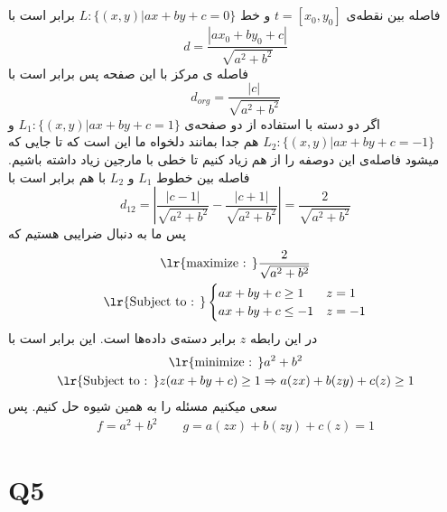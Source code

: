 \documentclass[a4paper]{article}
\begin{document}
\subsection{} 
فاصله بین نقطه‌ی
 $ t = [x_{0} , y_{0}]$
  و خط
 $ L : \{(x,y) | ax+by+c=0 \}  $
 برابر است با 
 \begin{equation*}
 	d = \frac{|ax_{0}+b y_{0}+c|}{\sqrt{a^{2} + b^{2}}}
 \end{equation*}
فاصله ی مرکز با این صفحه پس برابر است با 
\begin{equation*}
	d_{org} = \frac{|c|}{\sqrt{a^{2} + b^{2}}}
\end{equation*}
اگر دو دسته با استفاده از دو صفحه‌ی 
$ L_{1} : \{(x,y) | ax+by+c=1 \}  $
و 
$ L_{2} : \{(x,y) | ax+by+c=-1 \}  $
هم جدا بمانند دلخواه ما این است که تا جایی که میشود فاصله‌ی این دوصفه را از هم زیاد کنیم تا خطی با مارجین زیاد داشته باشیم. 
فاصله بین خطوط $ L_{1} $ و  $ L_{2} $ با هم برابر است با 
\begin{equation*}
	d_{12} = |\frac{|c-1|}{\sqrt{a^{2} + b^{2}}} - \frac{|c+1|}{\sqrt{a^{2} + b^{2}}}| = \frac{2}{\sqrt{a^{2} + b^{2}}}
\end{equation*}
پس ما به دنبال ضرایبی هستیم که 
\begin{gather*}
	\text{\lr{maximize : }} \frac{2}{\sqrt{a^{2} + b^{2}}}
	\\
	\text{\lr{Subject to : }} \begin{cases}
		ax + by + c \geq 1  & z = 1 \\
		ax + by + c \leq -1  & z = -1
	\end{cases}
\end{gather*}
در این رابطه $ z $ برابر دسته‌ی داده‌ها است. این برابر است با 
\begin{gather*}
	\text{\lr{minimize : }} a^{2} + b^{2}
	\\
	\text{\lr{Subject to : }} z(ax + by + c) \geq 1 \Rightarrow a (zx) + b (zy) + c(z) \geq 1
\end{gather*}
سعی میکنیم مسئله را به همین شیوه حل کنیم. پس 
\begin{gather*}
	f = a^{2} + b^{2} \qquad g = a (zx) + b (zy) + c(z) = 1
\end{gather*}
\newpage
\section{Q5}
\end{document}
